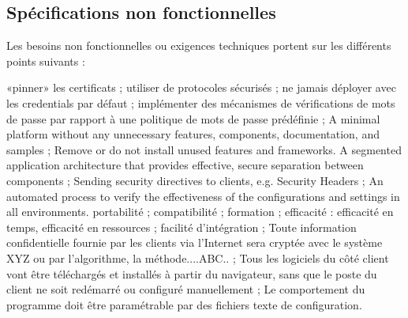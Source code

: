 \subsection{Spécifications non fonctionnelles}
Les besoins non fonctionnelles ou exigences techniques portent sur les différents points suivants :
\begin{itemize}
	\itemcheck «pinner» les certificats ; 
	\itemcheck utiliser de protocoles sécurisés ;
	\itemcheck ne jamais déployer avec les credentials par défaut ;
	\itemcheck implémenter des mécanismes de vérifications de mots de passe par rapport à une politique de mots de passe prédéfinie ;
	\itemcheck A minimal platform without any unnecessary features, components, documentation, and samples ;
	\itemcheck Remove or do not install unused features and frameworks.
	\itemcheck A segmented application architecture that provides effective, secure separation between components ;
	\itemcheck Sending security directives to clients, e.g. Security Headers ;
	\itemcheck An automated process to verify the effectiveness of the configurations and settings in all environments.
	\itemcheck portabilité ;
	\itemcheck compatibilité ;
	\itemcheck formation ;
	\itemcheck efficacité : efficacité en temps, efficacité en ressources ;
	\itemcheck facilité d'intégration ;
	\itemcheck Toute information confidentielle fournie par les  clients via l’Internet sera cryptée avec le système XYZ  ou par l’algorithme, la méthode....ABC.. ;
	\itemcheck Tous les logiciels du côté client vont être  téléchargés et installés à partir du navigateur, sans que  le poste du client ne soit redémarré ou configuré manuellement ;
	\itemcheck Le comportement du programme doit être paramétrable par des fichiers texte de configuration.
\end{itemize}

